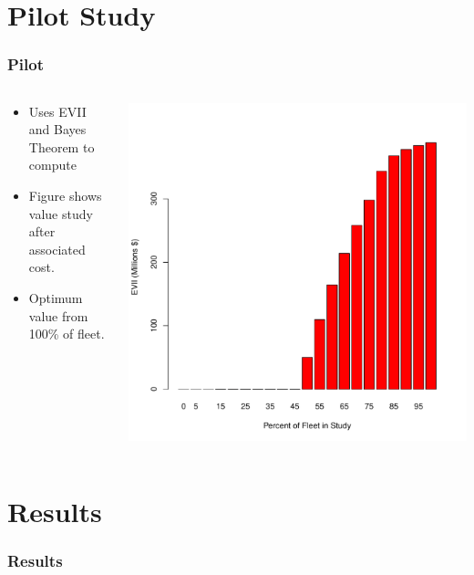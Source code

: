 \documentclass{beamer}
\begin{document}
\section{Pilot Study}
\begin{frame}
  \frametitle{Pilot}
  \begin{columns}
    \begin{column}{0.4\textwidth}
      \begin{itemize}
      \item Uses EVII and Bayes Theorem to compute
      \item Figure shows value study after associated cost.
      \item Optimum value from 100\% of fleet.
      \end{itemize}
    \end{column}
    \begin{column}{0.6\textwidth}
      \centering
      \includegraphics[width=\textwidth]{../../R/alt3barplot}
    \end{column}
  \end{columns}
\end{frame}

\section{Results}
\begin{frame}
  \frametitle{Results}

  \centering
\end{frame}
\end{document}
